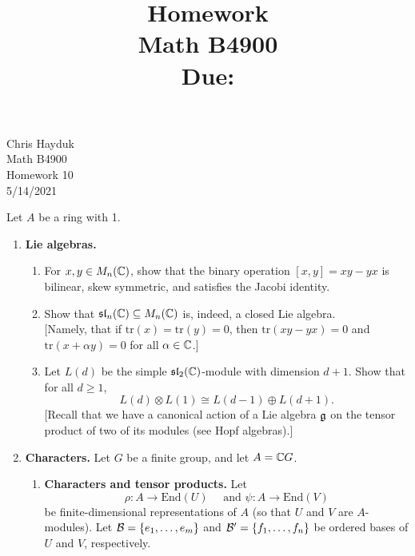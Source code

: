 \documentclass[11pt, reqno]{amsart}
\title[Homework \HW]{Homework \HW \\
Math B4900\\
\small Due: \DUE}
\author{}
\theoremstyle{plain}
\theoremstyle{definition}
\theoremstyle{example}
\def\End{\mathrm{End}}
\def\tr{\mathrm{tr}}
\def\HW{10}
\def\DUE{5/14/2021}
\begin{document}
\begin{flushright}
Chris Hayduk\\
Math B4900\\
Homework \HW\\
\DUE
\end{flushright}


Let $A$ be a ring with 1.
\begin{enumerate}[I ]
\item \textbf{Lie algebras.}
\begin{enumerate}[1.]
 \item For $x, y \in M_n(\mathbb{C})$, show that the binary operation $[x,y] = xy - yx$ is bilinear, skew symmetric, and satisfies the Jacobi identity. 

\item Show that $\mathfrak{sl}_n(\mathbb{C}) \subseteq M_n(\mathbb{C})$ is, indeed, a closed Lie algebra. \\
{[Namely, that if $\tr(x) = \tr(y) = 0$, then $\tr(xy-yx) = 0$ and $\tr(x + \alpha y) = 0$ for all $\alpha \in \mathbb{C}$.]}


\item Let $L(d)$ be the simple $\mathfrak{sl}_2(\mathbb{C})$-module with dimension $d+1$. Show that for all $d \ge 1$, 
$$L(d) \otimes L(1) \cong L(d-1) \oplus L(d+1).$$
{[Recall that we have a canonical action of a Lie algebra $\mathfrak{g}$ on the tensor product of two of its modules (see Hopf algebras).]}

\end{enumerate}
 
\item 
\textbf{Characters.} Let $G$ be a finite group, and let $A = \mathbb{C} G$. 
\begin{enumerate}[1.]
\item \textbf{Characters and tensor products.} Let 
$$\rho: A \to \End(U) \quad \text{ and } \psi: A \to \End(V)$$
be finite-dimensional representations of $A$ (so that $U$ and $V$ are $A$-modules). Let $\mathcal{B} = \{e_1, \dots, e_m\}$ and $\mathcal{B}' =\{f_1, \dots, f_n\}$ be ordered bases of $U$ and $V$, respectively. 


\end{enumerate}
\end{enumerate}
\end{document}

